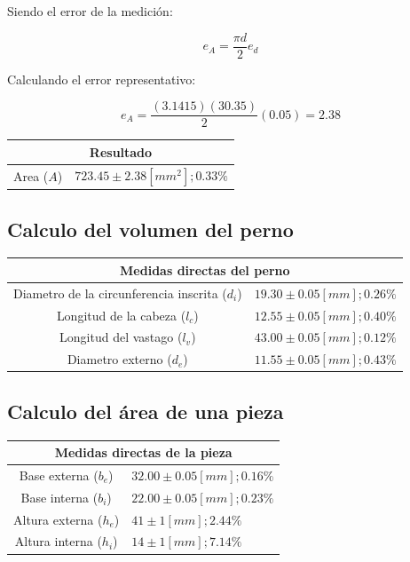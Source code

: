 \documentclass[letter,11pt]{article}
\begin{document}
Siendo el error de la medición:

\begin{equation}
    e_A = \frac{\pi d}{2} e_d
\end{equation}

Calculando el error representativo:

\begin{equation}
    e_A = \frac{(3.1415)(30.35)}{2}(0.05) = 2.38
\end{equation}

\begin{center}
\begin{tabular}{|c|>{\centering}m{5.0cm}<{\centering}|}
\hline
\multicolumn{2}{|c|}{\textbf{Resultado}}
\tabularnewline \hline
Area ($A$) & $723.45 \pm 2.38 [mm^2]; 0.33\%$ \tabularnewline \hline
\end{tabular}
\end{center}

\subsection{Calculo del volumen del perno}
\begin{center}
\begin{tabular}{|c|>{\centering}m{5.0cm}<{\centering}|}
\hline
\multicolumn{2}{|c|}{\textbf{Medidas directas del perno}}
\tabularnewline \hline
Diametro de la circunferencia inscrita ($d_i$) & $19.30 \pm 0.05 [mm]; 0.26\%$
\tabularnewline \hline
                 Longitud de la cabeza ($l_c$) & $12.55 \pm 0.05 [mm]; 0.40\%$
\tabularnewline \hline
                  Longitud del vastago ($l_v$) & $43.00 \pm 0.05 [mm]; 0.12\%$
\tabularnewline \hline
                      Diametro externo ($d_e$) & $11.55 \pm 0.05 [mm]; 0.43\%$
\tabularnewline \hline
\end{tabular}
\end{center}

\subsection{Calculo del área de una pieza}
\begin{center}
\begin{tabular}{|c|>{\centering}m{5.0cm}<{\centering}|}
\hline
\multicolumn{2}{|c|}{\textbf{Medidas directas de la pieza}}
\tabularnewline \hline
  Base externa ($b_e$) & $32.00 \pm 0.05 [mm]; 0.16\%$ \tabularnewline \hline
  Base interna ($b_i$) & $22.00 \pm 0.05 [mm]; 0.23\%$ \tabularnewline \hline
Altura externa ($h_e$) & $41    \pm 1    [mm]; 2.44\%$ \tabularnewline \hline
Altura interna ($h_i$) & $14    \pm 1    [mm]; 7.14\%$ \tabularnewline \hline
\end{tabular}
\end{center}
\end{document}
